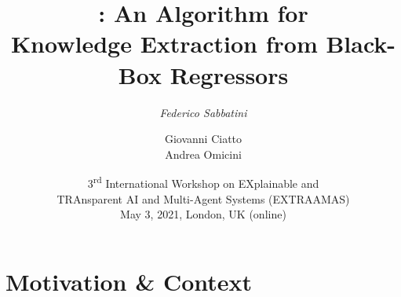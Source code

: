 \documentclass[presentation]{beamer}
\title[\gridex]{
	\gridex: An Algorithm for
	\\
	Knowledge Extraction from Black-Box Regressors
}
\author[F. Sabbatini et al.]{
	\emph{Federico Sabbatini} %
	\and 
	Giovanni Ciatto
	\\
	Andrea Omicini
}
\institute[UniBo]{
    Dipartimento di Informatica -- Scienza e Ingegneria (DISI)
    \\
    \textsc{Alma Mater Studiorum} -- Università di Bologna
    \\
    \texttt{
        \{\emph{f.sabbatini}, giovanni.ciatto, andrea.omicini\}@unibo.it %
    }
}
\date[EXTRAAMAS, 2021]{
	3\textsuperscript{rd} International Workshop on EXplainable and
	\\
	TRAnsparent AI and Multi-Agent Systems (EXTRAAMAS)
	\\
	May 3, 2021, London, UK (online)
}
\begin{document}

\frame{\titlepage}

\section{Motivation \& Context} %
\end{document}
